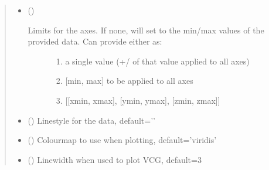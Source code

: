 \documentclass[letterpaper,10pt,english]{sphinxmanual}
\begin{document}
\begin{fulllineitems}
\begin{quote}
\begin{description}
\begin{itemize}
\item {} 
\sphinxAtStartPar
{} (\sphinxstyleliteralemphasis{\sphinxupquote{, }}) \textendash{} \begin{description}
\item[{Limits for the axes. If none, will set to the min/max values of the provided data. Can provide either as:}] \leavevmode\begin{enumerate}
%
\item {} 
\sphinxAtStartPar
a single value (+/\sphinxhyphen{} of that value applied to all axes)

\item {} 
\sphinxAtStartPar
{[}min, max{]} to be applied to all axes

\item {} 
\sphinxAtStartPar
{[}{[}xmin, xmax{]}, {[}ymin, ymax{]}, {[}zmin, zmax{]}{]}

\end{enumerate}

\end{description}


\item {} 
\sphinxAtStartPar
{} (\sphinxstyleliteralemphasis{\sphinxupquote{, }}) \textendash{} Linestyle for the data, default=’\sphinxhyphen{}’

\item {} 
\sphinxAtStartPar
{} (\sphinxstyleliteralemphasis{\sphinxupquote{, }}) \textendash{} Colourmap to use when plotting, default=’viridis’

\item {} 
\sphinxAtStartPar
{} (\sphinxstyleliteralemphasis{\sphinxupquote{, }}) \textendash{} Linewidth when used to plot VCG, default=3


\end{itemize}
\end{description}
\end{quote}
\end{fulllineitems}
\end{document}
